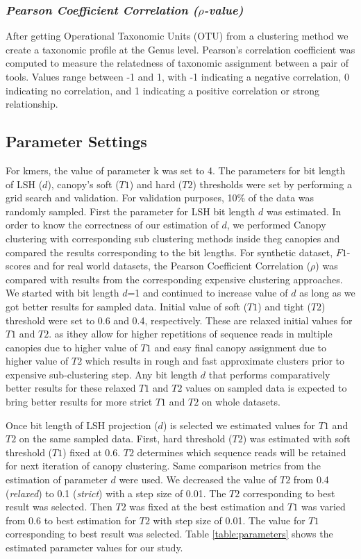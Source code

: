 \documentclass[10pt, conference, compsocconf]{IEEEtran}
\begin{document}
\subsubsection{\textit{Pearson Coefficient Correlation ($\rho$-value)}}
After getting Operational Taxonomic Units (OTU) from a clustering method we create a taxonomic profile at the Genus level. Pearson’s correlation coefficient was computed to measure the relatedness of taxonomic assignment between a pair of tools. Values range between -1 and 1, with -1 indicating a negative correlation, 0 indicating no correlation, and 1 indicating a positive correlation or strong relationship.

\subsection{\textbf{Parameter Settings}}
For kmers, the value of parameter k was set to 4. The parameters for bit length of LSH ($d$), canopy's soft ($T1$) and 
hard ($T2$) thresholds were set by performing a grid search and validation. For validation purposes, 10\%  of the 
data was randomly sampled. First the parameter for LSH bit length $d$ was estimated. In order to know the 
correctness of our estimation of $d$, we performed Canopy clustering with corresponding sub clustering methods 
inside theg 
canopies and compared the results corresponding to the bit lengths. For synthetic dataset, $F1$-scores and for real world datasets, the 
Pearson Coefficient Correlation ($\rho$) was compared 
with results from the 
corresponding expensive  clustering approaches. We started with bit length $d$=1 and continued to increase value of $d$ as long as we 
got better results for sampled data. Initial value of soft ($T1$) and tight ($T2$) threshold  were
set to 0.6 and 0.4, respectively. These are 
relaxed initial values for 
$T1$ and $T2$. 
%
as ithey allow for higher repetitions of sequence reads in multiple canopies due to higher value of $T1$ and easy final canopy assignment due to higher value of $T2$ which results in rough and fast approximate clusters prior to 
expensive sub-clustering step. Any bit length $d$ that performs 
comparatively better results for these relaxed $T1$ and $T2$ values 
on sampled data is expected to bring better results for more strict $T1$ and $T2$ on whole datasets.

Once bit length of LSH projection ($d$) is selected we estimated values for $T1$ and $T2$ on the same sampled data. First, hard threshold ($T2$) was estimated with soft 
threshold ($T1$) fixed at 0.6. $T2$ determines which sequence reads will be retained for next 
iteration of canopy clustering. Same comparison metrics from the estimation of parameter $d$ were used. We decreased the value of $T2$
from 0.4 (\emph{relaxed}) to 0.1 (\emph{strict}) with a step size of 
0.01. The $T2$ corresponding to best result was selected. Then $T2$ was fixed 
at the best estimation and $T1$ was varied from 0.6 to best 
estimation for $T2$ with step size of 0.01. The value for $T1$ corresponding to best 
result was selected. Table \ref{table:parameters} shows the estimated parameter values for our study.   
\end{document}
